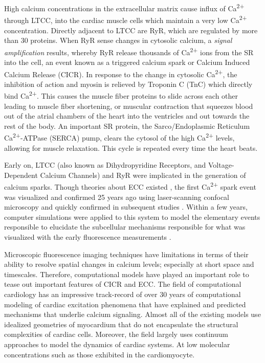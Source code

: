 \documentclass[12pt]{ucsddissertation}
\begin{document}
High calcium concentrations in the extracellular matrix cause influx of Ca\textsuperscript{2+} through LTCC, into the cardiac muscle cells which maintain a very low Ca\textsuperscript{2+}  concentration. Directly adjacent to LTCC are RyR, which are regulated by more than 30 proteins\cite{Fill2002}. When RyR sense changes in cytosolic calcium, a \textit{signal amplification} results, whereby RyR release thousands of Ca\textsuperscript{2+} ions from the SR into the cell, an event known as a triggered calcium spark or Calcium Induced Calcium Release (CICR). In response to the change in cytosolic Ca\textsuperscript{2+}, the inhibition of action and myosin is relieved by Troponin C (TnC) which directly bind Ca\textsuperscript{2+}. This causes the muscle fiber proteins to slide across each other leading to muscle fiber shortening, or muscular contraction that squeezes blood out of the atrial chambers of the heart into the ventricles and out towards the rest of the body. An important SR protein, the Sarco/Endoplasmic Reticulum Ca\textsuperscript{2+}-ATPase (SERCA) pump, clears the cytosol of the high Ca\textsuperscript{2+} levels, allowing for muscle relaxation. This cycle is repeated every time the heart beats.

Early on, LTCC (also known as Dihydropyridine Receptors, and Voltage-Dependent Calcium Channels) \cite{Lu1994} and RyR \cite{Stern1999} were implicated in the generation of calcium sparks. Though theories about ECC existed \cite{Stern1992}, the first Ca\textsuperscript{2+} spark event was visualized and confirmed 25 years ago using laser-scanning confocal microscopy \cite{Cheng1993} and quickly confirmed in subsequent studies \cite{Cannell1994,Cannell1995}. Within a few years, computer simulations were applied to this system to model the elementary events responsible to elucidate the subcellular mechanisms responsible for what was visualized with the early fluorescence measurements \cite{Cannell1997}.

Microscopic fluorescence imaging techniques have limitations in terms of their ability to resolve spatial changes in calcium levels; especially at short space and timescales. Therefore, computational models have played an important role to tease out important features of CICR and ECC. The field of computational cardiology has an impressive track-record of over 30 years of computational modeling of cardiac excitation phenomena that have explained and predicted mechanisms that underlie calcium signaling\cite{Maleckar2017}. Almost all of the existing models use idealized geometries of myocardium that do not encapsulate the structural complexities of cardiac cells. Moreover, the field largely uses continuum approaches to model the dynamics of cardiac systems. At low molecular concentrations such as those exhibited in the cardiomyocyte.
\end{document}
